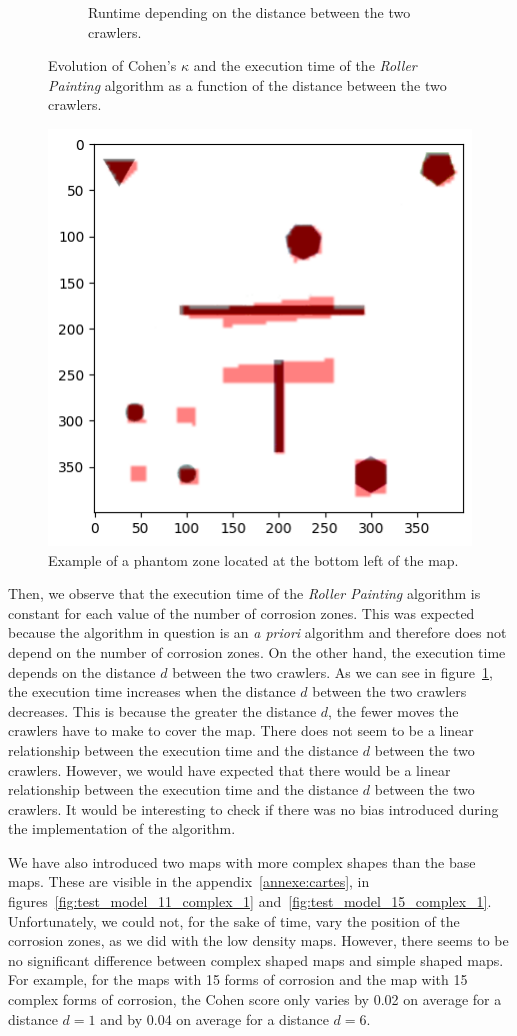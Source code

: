 \begin{figure}[h!]
\begin{subfigure}[t]{0.49\linewidth}
			\caption{Runtime depending on the distance between the two crawlers.}
			\label{fig:peinture_au_rouleau-time_vs_distance}
	\end{subfigure}
	\caption{Evolution of Cohen's $\kappa$ and the execution time of the \textit{Roller Painting} algorithm as a function of the distance between the two crawlers.}
	\label{fig:peinture_au_rouleau-distance}
\end{figure}

\begin{figure}[h!]
	\centering
	\includegraphics[width=0.5\linewidth]{graphics/output.png}
	\caption{Example of a phantom zone located at the bottom left of the map.}
	\label{fig:ghost_zone}
\end{figure}

Then, we observe that the execution time of the \textit{Roller Painting} algorithm is constant for each value of the number of corrosion zones.
This was expected because the algorithm in question is an \textit{a priori} algorithm and therefore does not depend on the number of corrosion zones.
On the other hand, the execution time depends on the distance $d$ between the two crawlers.
As we can see in figure~\ref{fig:peinture_au_rouleau-time_vs_distance}, the execution time increases when the distance $d$ between the two crawlers decreases.
This is because the greater the distance $d$, the fewer moves the crawlers have to make to cover the map.
There does not seem to be a linear relationship between the execution time and the distance $d$ between the two crawlers.
However, we would have expected that there would be a linear relationship between the execution time and the distance $d$ between the two crawlers.
It would be interesting to check if there was no bias introduced during the implementation of the algorithm.

We have also introduced two maps with more complex shapes than the base maps.
These are visible in the appendix~\ref{annexe:cartes}, in figures~\ref{fig:test_model_11_complex_1} and~\ref{fig:test_model_15_complex_1}.
Unfortunately, we could not, for the sake of time, vary the position of the corrosion zones, as we did with the low density maps.
However, there seems to be no significant difference between complex shaped maps and simple shaped maps.
For example, for the maps with 15 forms of corrosion and the map with 15 complex forms of corrosion, the Cohen score only varies by 0.02 on average for a distance $d = 1$ and by 0.04 on average for a distance $d = 6$.

